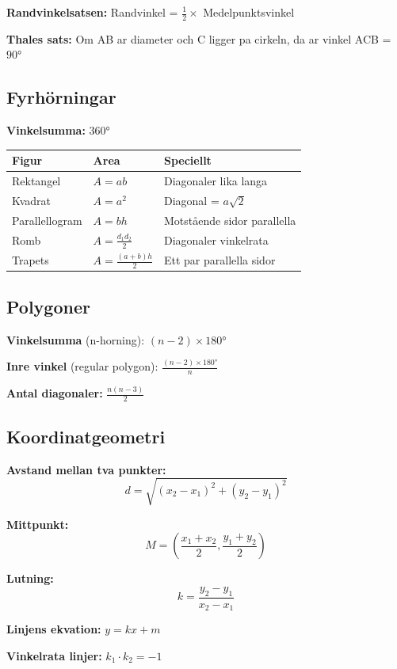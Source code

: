 \documentclass[11pt,a4paper]{article}
\newenvironment{formelbox}{\begin{framed}\color{mainblue}}{\end{framed}}
\begin{document}
\textbf{Randvinkelsatsen:} Randvinkel = $\frac{1}{2} \times$ Medelpunktsvinkel

\textbf{Thales sats:} Om AB ar diameter och C ligger pa cirkeln, da ar vinkel ACB = $90°$

\subsection{Fyrhörningar}

\textbf{Vinkelsumma:} $360°$

\begin{tabular}{|l|l|l|}
\hline
\textbf{Figur} & \textbf{Area} & \textbf{Speciellt} \\
\hline
Rektangel & $A = ab$ & Diagonaler lika langa \\
Kvadrat & $A = a^2$ & Diagonal = $a\sqrt{2}$ \\
Parallellogram & $A = bh$ & Motstående sidor parallella \\
Romb & $A = \frac{d_1 d_2}{2}$ & Diagonaler vinkelrata \\
Trapets & $A = \frac{(a+b)h}{2}$ & Ett par parallella sidor \\
\hline
\end{tabular}

\subsection{Polygoner}

\textbf{Vinkelsumma} (n-horning): $(n-2) \times 180°$

\textbf{Inre vinkel} (regular polygon): $\frac{(n-2) \times 180°}{n}$

\textbf{Antal diagonaler:} $\frac{n(n-3)}{2}$

\subsection{Koordinatgeometri}

\begin{formelbox}
\textbf{Avstand mellan tva punkter:}
\[ d = \sqrt{(x_2-x_1)^2 + (y_2-y_1)^2} \]
\end{formelbox}

\textbf{Mittpunkt:}
\[ M = \left(\frac{x_1+x_2}{2}, \frac{y_1+y_2}{2}\right) \]

\textbf{Lutning:}
\[ k = \frac{y_2 - y_1}{x_2 - x_1} \]

\textbf{Linjens ekvation:} $y = kx + m$

\textbf{Vinkelrata linjer:} $k_1 \cdot k_2 = -1$
\end{document}
